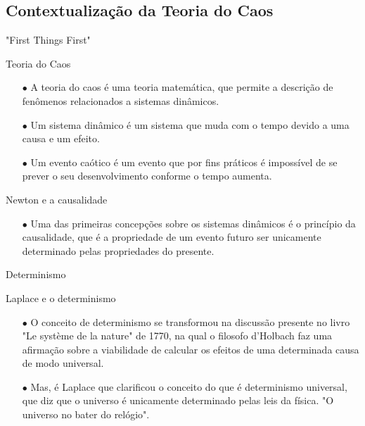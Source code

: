\documentclass{beamer}
\begin{document}
\subsection{Contextualização da Teoria do Caos}
\begin{frame}{"First Things First"}
    \begin{exampleblock}{Teoria do Caos}
        \begin{itemize}
		\item [$\bullet$] A teoria do caos é uma teoria matemática, que permite a descrição de fenômenos relacionados a sistemas dinâmicos.
		\item [$\bullet$] Um sistema dinâmico é um sistema que muda com o tempo devido a uma causa e um efeito.
		\item [$\bullet$] Um evento caótico é um evento que por fins práticos é impossível de se prever o seu desenvolvimento conforme o tempo aumenta.
        \end{itemize}
    \end{exampleblock}
    \begin{exampleblock}{Newton e a causalidade}
    	\begin{itemize}
    		\item [$\bullet$] Uma das primeiras concepções sobre os sistemas dinâmicos é o princípio da causalidade, que é a propriedade de um evento futuro ser  unicamente determinado pelas propriedades do presente.
    	\end{itemize}
    \end{exampleblock}
\end{frame}

\begin{frame}{Determinismo}
			
	\begin{exampleblock}{Laplace e o determinismo}
		\begin{itemize}
			\item [$\bullet$] O conceito de determinismo se transformou na discussão presente no livro "Le système de la nature" de 1770, na qual o filosofo d'Holbach faz uma afirmação sobre a viabilidade de calcular os efeitos de uma determinada causa de modo universal.
			
			\item [$\bullet$] Mas, é Laplace que clarificou o conceito do que é determinismo universal, que diz que o universo é unicamente determinado pelas leis da física. "O universo no bater do relógio".
	
		\end{itemize}
	\end{exampleblock}
\end{frame}
\end{document}
